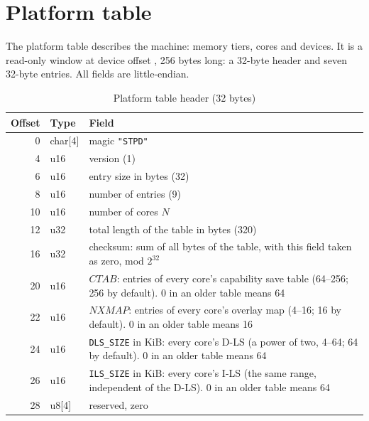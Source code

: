 \section{Platform table}\label{sec:stpd}

The platform table describes the machine: memory tiers, cores and devices. It is a read-only window at
device offset , 256 bytes long: a 32-byte header and seven 32-byte entries. All fields are
little-endian.

\begin{table}[htbp]
\centering\small
\caption{Platform table header (32 bytes)}\label{tab:stpdhdr}
\begin{tabular}{@{}r l l@{}}
\toprule
\textbf{Offset} & \textbf{Type} & \textbf{Field}\\\midrule
0 & char[4] & magic \texttt{"STPD"}\\
4 & u16 & version (1)\\
6 & u16 & entry size in bytes (32)\\
8 & u16 & number of entries (9)\\
10 & u16 & number of cores $N$\\
12 & u32 & total length of the table in bytes (320)\\
16 & u32 & checksum: sum of all bytes of the table, with this field taken as zero, mod $2^{32}$\\
20 & u16 & $\textit{CTAB}$: entries of every core's capability save table (64--256; 256 by default). 0 in an older table means 64\\
22 & u16 & $\textit{NXMAP}$: entries of every core's overlay map (4--16; 16 by default). 0 in an older table means 16\\
24 & u16 & \texttt{DLS\_SIZE} in KiB: every core's D-LS (a power of two, 4--64; 64 by default). 0 in an older table means 64\\
26 & u16 & \texttt{ILS\_SIZE} in KiB: every core's I-LS (the same range, independent of the D-LS). 0 in an older table means 64\\
28 & u8[4] & reserved, zero\\
\bottomrule
\end{tabular}
\end{table}

